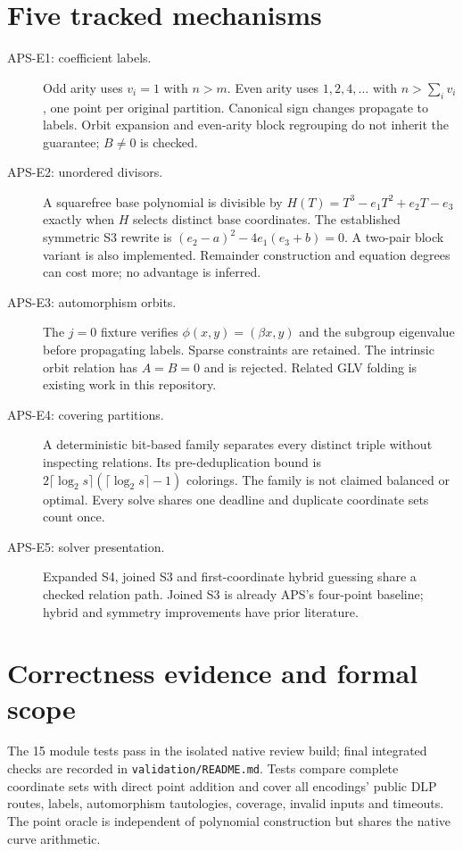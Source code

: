 \documentclass[10pt]{article}
\begin{document}
\section*{Five tracked mechanisms}
\begin{description}
\item[APS-E1: coefficient labels.] Odd arity uses $v_i=1$ with $n>m$.
Even arity uses $1,2,4,\ldots$ with $n>\sum_i v_i$, one point per original
partition. Canonical sign changes propagate to labels. Orbit expansion and
even-arity block regrouping do not inherit the guarantee; $B\ne0$ is checked.
\item[APS-E2: unordered divisors.] A squarefree base polynomial is divisible
by $H(T)=T^3-e_1T^2+e_2T-e_3$ exactly when $H$ selects distinct base
coordinates. The established symmetric S3 rewrite is
$(e_2-a)^2-4e_1(e_3+b)=0$. A two-pair block variant is also implemented.
Remainder construction and equation degrees can cost more; no advantage is inferred.
\item[APS-E3: automorphism orbits.] The $j=0$ fixture verifies
$\phi(x,y)=(\beta x,y)$ and the subgroup eigenvalue before propagating labels.
Sparse constraints are retained. The intrinsic orbit relation has $A=B=0$
and is rejected. Related GLV folding is existing work in this repository.
\item[APS-E4: covering partitions.] A deterministic bit-based family separates
every distinct triple without inspecting relations. Its pre-deduplication
bound is $2\lceil\log_2 s\rceil(\lceil\log_2 s\rceil-1)$ colorings.
The family is not claimed balanced or optimal. Every solve shares one
deadline and duplicate coordinate sets count once.
\item[APS-E5: solver presentation.] Expanded S4, joined S3 and first-coordinate
hybrid guessing share a checked relation path. Joined S3 is already APS's
four-point baseline; hybrid and symmetry improvements have prior literature.
\end{description}

\section*{Correctness evidence and formal scope}
The 15 module tests pass in the isolated native review build; final integrated
checks are recorded in \texttt{validation/README.md}. Tests compare complete
coordinate sets with direct point addition and cover all encodings' public
DLP routes, labels, automorphism tautologies, coverage, invalid inputs and
timeouts. The point oracle is independent of polynomial construction but
shares the native curve arithmetic.
\end{document}
